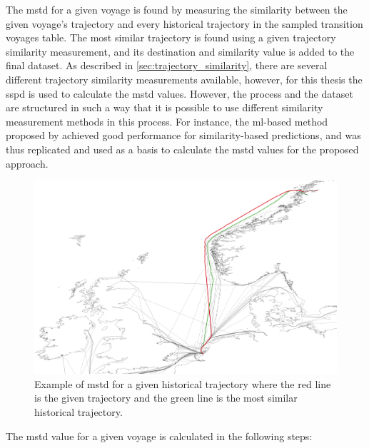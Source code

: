 The \acrshort{mstd} for a given voyage is found by measuring the similarity between the given voyage's trajectory and every historical trajectory in the sampled transition voyages table. The most similar trajectory is found using a given trajectory similarity measurement, and its destination and similarity value is added to the final dataset. As described in \cref{sec:trajectory_similarity}, there are several different trajectory similarity measurements available, however, for this thesis the \acrfull{sspd} is used to calculate the \acrshort{mstd} values. However, the process and the dataset are structured in such a way that it is possible to use different similarity measurement methods in this process. For instance, the \acrshort{ml}-based method proposed by  \cite{Zhang2020AISApproach} achieved good performance for similarity-based predictions, and was thus replicated and used as a basis to calculate the \acrshort{mstd} values for the proposed approach.

\begin{figure}[htbp]  %
    \centering
    \includegraphics[width=1.0\textwidth]{figures/mstd}
    \caption{Example of \acrshort{mstd} for a given historical trajectory where the red line is the given trajectory and the green line is the most similar historical trajectory.}
    \label{fig:mstd}
\end{figure}

The \acrshort{mstd} value for a given voyage is calculated in the following steps:

